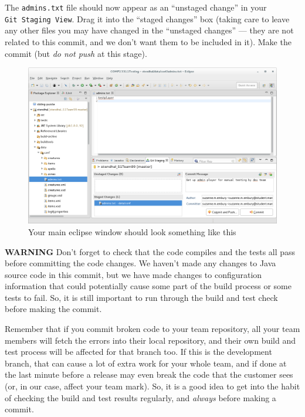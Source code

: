 \documentclass[
]{book}
\begin{document}
The \texttt{admins.txt} file should now appear as an ``unstaged change'' in your \texttt{Git\ Staging\ View}. Drag it into the ``staged changes'' box (taking care to leave any other files you may have changed in the ``unstaged changes'' --- they are not related to this commit, and we don't want them to be included in it). Make the commit (but \emph{do not push} at this stage).

\begin{figure}

{\centering \includegraphics[width=1\linewidth]{images/fileStagedForCommit} 

}

\caption{Your main eclipse window should look something like this}\label{fig:fileStagedForCommit-fig}
\end{figure}

\textbf{WARNING}
Don't forget to check that the code compiles and the tests all pass before committing the code changes. We haven't made any changes to Java source code in this commit, but we have made changes to configuration information that could potentially cause some part of the build process or some tests to fail. So, it is still important to run through the build and test check before making the commit.

Remember that if you commit broken code to your team repository, all your team members will fetch the errors into their local repository, and their own build and test process will be affected for that branch too. If this is the development branch, that can cause a lot of extra work for your whole team, and if done at the last minute before a release may even break the code that the customer sees (or, in our case, affect your team mark). So, it is a good idea to get into the habit of checking the build and test results regularly, and \emph{always} before making a commit.
\end{document}
